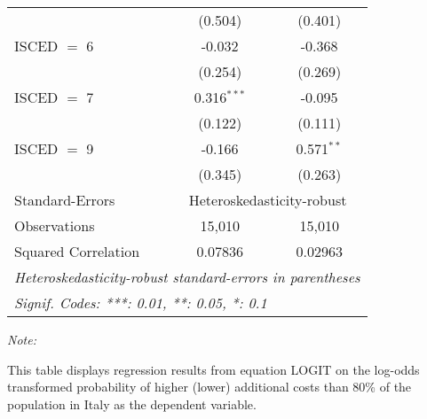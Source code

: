 \begin{table}[htbp!]
\begin{adjustbox}{width = 1\textwidth, max height = 0.95\textheight, center}
\begin{threeparttable}[b]
\begin{tabular}{lcc}
                                 & (0.504)        & (0.401)\\   
            ISCED $=$ 6          & -0.032         & -0.368\\   
                                 & (0.254)        & (0.269)\\   
            ISCED $=$ 7          & 0.316$^{***}$  & -0.095\\   
                                 & (0.122)        & (0.111)\\   
            ISCED $=$ 9          & -0.166         & 0.571$^{**}$\\   
                                 & (0.345)        & (0.263)\\   
            \midrule 
            Standard-Errors & \multicolumn{2}{c}{Heteroskedasticity-robust} \\ 
            Observations         & 15,010         & 15,010\\  
            Squared Correlation  & 0.07836        & 0.02963\\  
            \midrule \midrule
            \multicolumn{3}{l}{\emph{Heteroskedasticity-robust standard-errors in parentheses}}\\
            \multicolumn{3}{l}{\emph{Signif. Codes: ***: 0.01, **: 0.05, *: 0.1}}\\
         \end{tabular}
         
         \begin{tablenotes}\item \medskip \textit{Note:}
            \item This table displays regression results from equation LOGIT on the log-odds transformed probability of higher (lower) additional costs than 80\% of the population in Italy as the dependent variable. 
         \end{tablenotes}
      \end{threeparttable}
   \end{adjustbox}
\end{table}


